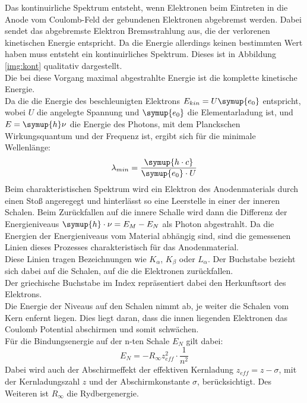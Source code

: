 Das kontinuirliche Spektrum entsteht, wenn Elektronen beim Eintreten in die Anode vom Coulomb-Feld der gebundenen Elektronen abgebremst werden. 
Dabei sendet das abgebremste Elektron Bremsstrahlung aus, die der verlorenen kinetischen Energie entspricht. 
Da die Energie allerdings keinen bestimmten Wert haben muss entsteht ein kontinuirliches Spektrum. Dieses ist in Abbildung \ref{img:kont} qualitativ dargestellt.\\
Die bei diese Vorgang maximal abgestrahlte Energie ist die komplette kinetische Energie.\\
Da die die Energie des beschleunigten Elektrons $E_{kin}= U \symup{e_0}$ entspricht, wobei $U$ die angelegte Spannung und $\symup{e_0}$ die Elementarladung \cite{e0} ist, und
$E= \symup{h} \nu$ die Energie des Photons, mit dem Planckschen Wirkungsquantum\cite{h} und der Frequenz ist, ergibt sich für die minimale Wellenlänge:
\begin{equation*}
    \lambda_{min}=\frac{\symup{h \cdot c}}{\symup{e_0}\cdot U}
\end{equation*}
\newline
\noindent
Beim charakteristischen Spektrum wird ein Elektron des Anodenmaterials durch einen Stoß angeregegt und hinterlässt so eine Leerstelle in einer der inneren Schalen. 
Beim Zurückfallen auf die innere Schalle wird dann die Differenz der Energieniveaus $\symup{h} \cdot \nu=  E_M-E_N$ als Photon abgestrahlt.
Da die Energien der Energieniveaus vom Material abhängig sind, sind die gemessenen Linien dieses Prozesses charakteristisch für das Anodenmaterial.\\
Diese Linien tragen Bezeichnungen wie $K_\alpha$, $K_\beta$ oder $L_\alpha$. Der Buchstabe bezieht sich dabei auf die Schalen, auf die die Elektronen zurückfallen. \\
Der griechische Buchstabe im Index repräsentiert dabei den Herkunftsort des Elektrons.\\
Die Energie der Niveaus auf den Schalen nimmt ab, je weiter die Schalen vom Kern enfernt liegen. 
Dies liegt daran, dass die innen liegenden Elektronen das Coulomb Potential abschirmen und somit schwächen.\\
Für die Bindungsenergie auf der n-ten Schale $E_N$ gilt dabei:
\begin{equation*}
    E_N=-R_{\infty} z_{eff}^2 \cdot \frac{1}{n^2}
\end{equation*}
Dabei wird auch der Abschirmeffekt der effektiven Kernladung $z_{eff}=z-\sigma$, mit der Kernladungszahl $z$ und der Abschirmkonstante $\sigma$, berücksichtigt.
Des Weiteren ist $R_\infty$ die Rydbergenergie\cite{Ryd}.\\\\

